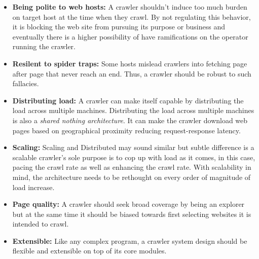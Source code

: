 \begin{itemize}
\item \textbf{Being polite to web hosts:} A crawler shouldn't induce too much burden on target host
  at the time when they crawl. By not regulating this behavior, it is blocking the web site from pursuing
  its purpose or business and eventually there is a higher possibility of have ramifications on the
  operator running the crawler.
\item \textbf{Resilent to spider traps:} Some hosts mislead crawlers into fetching page after page that
  never reach an end. Thus, a crawler should be robust to such fallacies.
\item \textbf{Distributing load:} A crawler can make itself capable by distributing the load across
  multiple machines. Distributing the load across multiple machines is also a \textit{shared nothing
    architecture}. It can make the crawler download web pages based on geographical proximity reducing
  request-response latency.
\item \textbf{Scaling:} Scaling and Distributed may sound similar but subtle difference is a scalable
  crawler's sole purpose is to cop up with load as it comes, in this case, pacing the crawl rate as well
  as enhancing the crawl rate. With scalability in mind, the architecture needs to be rethought on every
  order of magnitude of load increase.
\item \textbf{Page quality:} A crawler should seek broad coverage by being an explorer but at the same
  time it should be biased towards first selecting websites it is intended to crawl.
\item \textbf{Extensible:} Like any complex program, a crawler system design should be flexible and
  extensible on top of its core modules.
\end{itemize}

\pagebreak